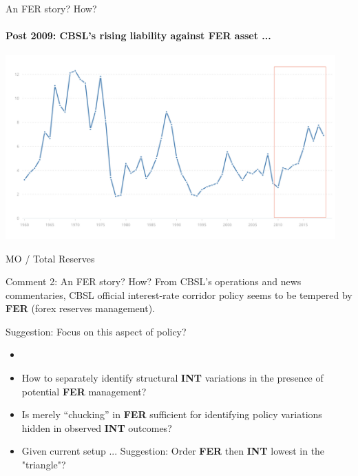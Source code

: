 \documentclass[10pt,english,slidetop,compress,
              blue,mathserif,color=option]{beamer}
\theoremstyle{plain}
\theoremstyle{definition}
\begin{document}
\begin{frame}{An FER story? How?}
  \framesubtitle{Post 2009: CBSL's rising liability against FER asset ...}
  \includegraphics[width=0.95\textwidth]{figures/M0-to-totalreserves.png} 
  \begin{center}
    MO / Total Reserves
  \end{center}
\end{frame}

\begin{frame}{Comment 2: An FER story? How?}
  From CBSL's operations and news commentaries, CBSL official interest-rate corridor policy seems to be tempered by \textbf{FER} (forex reserves management).

  \bigskip
  Suggestion: Focus on this aspect of policy?
    \begin{itemize}
      \item 
      \item How to separately identify structural \textbf{INT} variations in the presence of potential \textbf{FER} management?
      \item Is merely ``chucking'' in \textbf{FER} sufficient for identifying policy variations hidden in observed \textbf{INT} outcomes?
      \item Given current setup ... Suggestion: Order \textbf{FER} then \textbf{INT} lowest in the "triangle"?
    \end{itemize}
\end{frame}
\end{document}
